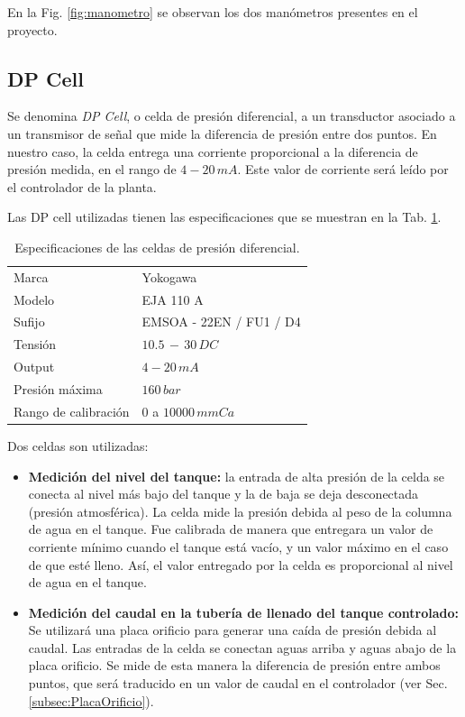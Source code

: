 En la Fig. \ref{fig:manometro} se observan los dos manómetros
presentes en el proyecto.



\subsection{DP Cell}
\label{subsec:DPCell}

Se denomina \textit{DP Cell}, o celda de presión diferencial, a un transductor
asociado a un transmisor de señal
que mide la diferencia de presión entre dos puntos.
En nuestro caso, la celda entrega una corriente proporcional a la diferencia de
presión medida, en el rango de $4-20\,mA$.
Este valor de corriente será leído por el controlador de la planta.

Las DP cell utilizadas tienen las especificaciones que se muestran en la Tab.
\ref{tab:caractDPcell}.

\begin{table}[ht]
\renewcommand{\arraystretch}{1.3}
\centering
\begin{tabular}{|l|l|}
\hline
Marca & Yokogawa\\
Modelo & EJA 110 A\\
Sufijo & EMSOA - 22EN / FU1 / D4\\
Tensión & $10.5\,-\,30 \, DC$\\
Output & $4-20\,mA$\\
Presión máxima & $160\,bar$\\
Rango de calibración & $0$ a $10000\,mmCa$\\
\hline
\end{tabular}
\caption{Especificaciones de las celdas de presión diferencial.}
\label{tab:caractDPcell}
\end{table}

Dos celdas son utilizadas:
\begin{itemize}
 \item \textbf{Medición del nivel del tanque:} la entrada de alta presión de la
celda
se conecta  al nivel más bajo del tanque y la de baja se deja desconectada
(presión atmosférica).
La celda mide la presión debida al peso de la columna de agua en el tanque.
Fue calibrada de manera que entregara un valor de corriente mínimo
cuando el tanque está vacío, y un valor máximo en el caso de que esté
lleno.
Así, el valor entregado por la celda es proporcional al nivel de
agua en el tanque.

\item \textbf{Medición del caudal en la tubería de llenado del tanque
controlado:}
Se utilizará una placa orificio para generar una caída de presión debida al
caudal.
Las entradas de la celda se conectan aguas arriba y aguas abajo
de la placa orificio.
Se mide de esta manera la diferencia de presión entre ambos puntos, que será
traducido en un valor de caudal en el
controlador (ver Sec. \ref{subsec:PlacaOrificio}).
\end{itemize}


